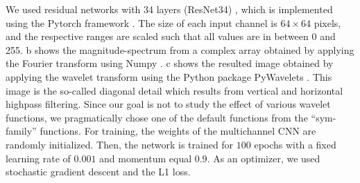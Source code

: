 \documentclass[11pt, authoryear]{elsarticle}
\begin{document}
	We used residual networks with 34 layers (ResNet34) \citep{he2016deep}, 
	which is implemented using the Pytorch framework \citep{NEURIPS2019_9015}. 
	The size of each input channel is $64\times64$ pixels, and the respective 
	ranges are scaled such that all values are in between 0 and 255. 
	b shows the magnitude-spectrum from 
	a complex array obtained by applying the Fourier transform using Numpy 
	\citep{harris2020array}.
	c shows the resulted image obtained by 
	applying the wavelet transform using the Python package PyWavelets
	\citep{lee2019pywavelets}. This image is the so-called diagonal detail 
	which results from vertical and horizontal highpass filtering. Since our 
	goal is not to study the effect of various wavelet functions, we pragmatically 
	chose one of the default functions from the \enquote{sym-family} functions.
	For training, the weights of the multichannel CNN are randomly initialized. 
	Then, the network is trained for $100$ epochs with a fixed learning rate of
	$0.001$ and momentum equal $0.9$. As an optimizer, we used stochastic gradient 
	descent and the L1 loss.
	
	
	
	
	
\end{document}
